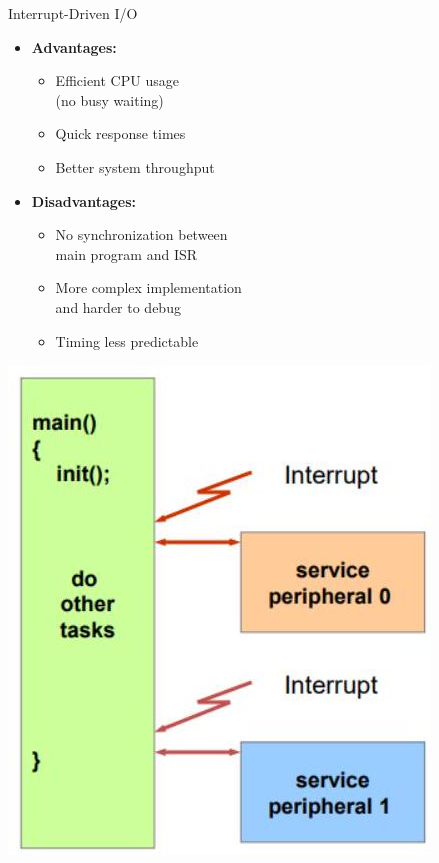 \begin{concept}{Interrupt-Driven I/O}
\begin{minipage}{0.6\linewidth}
\begin{itemize}
  \item \textbf{Advantages:}
    \begin{itemize}
      \item Efficient CPU usage\\ (no busy waiting)
      \item Quick response times
      \item Better system throughput
    \end{itemize}
  \item \textbf{Disadvantages:}
    \begin{itemize}
      \item No synchronization between \\main program and ISR %
      \item More complex implementation \\ and harder to debug
      \item Timing less predictable
    \end{itemize}
\end{itemize}
\end{minipage}
\begin{minipage}{0.39\linewidth}
\includegraphics[width=\linewidth]{images/2024_12_29_79e6b22f503fb7b4f718g-11(2)}
\end{minipage}
\end{concept}

